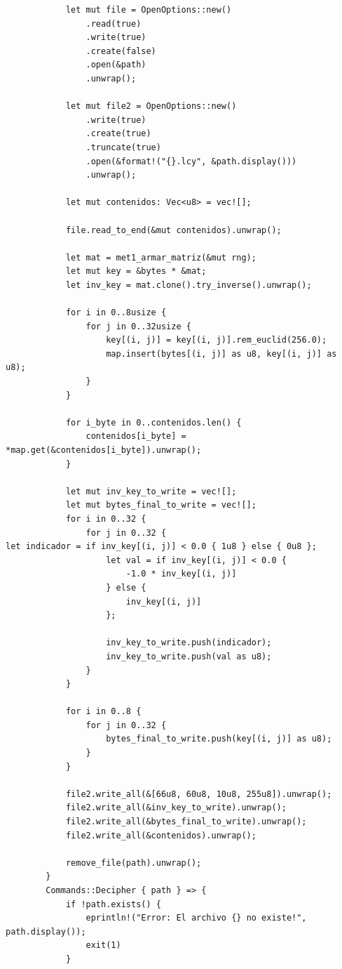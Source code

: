 \documentclass[a4paper]{article}
\begin{document}
\begin{verbatim}
            let mut file = OpenOptions::new()
                .read(true)
                .write(true)
                .create(false)
                .open(&path)
                .unwrap();

            let mut file2 = OpenOptions::new()
                .write(true)
                .create(true)
                .truncate(true)
                .open(&format!("{}.lcy", &path.display()))
                .unwrap();

            let mut contenidos: Vec<u8> = vec![];

            file.read_to_end(&mut contenidos).unwrap();

            let mat = met1_armar_matriz(&mut rng);
            let mut key = &bytes * &mat;
            let inv_key = mat.clone().try_inverse().unwrap();

            for i in 0..8usize {
                for j in 0..32usize {
                    key[(i, j)] = key[(i, j)].rem_euclid(256.0);
                    map.insert(bytes[(i, j)] as u8, key[(i, j)] as u8);
                }
            }

            for i_byte in 0..contenidos.len() {
                contenidos[i_byte] = *map.get(&contenidos[i_byte]).unwrap();
            }

            let mut inv_key_to_write = vec![];
            let mut bytes_final_to_write = vec![];
            for i in 0..32 {
                for j in 0..32 {
let indicador = if inv_key[(i, j)] < 0.0 { 1u8 } else { 0u8 };
                    let val = if inv_key[(i, j)] < 0.0 {
                        -1.0 * inv_key[(i, j)]
                    } else {
                        inv_key[(i, j)]
                    };

                    inv_key_to_write.push(indicador);
                    inv_key_to_write.push(val as u8);
                }
            }

            for i in 0..8 {
                for j in 0..32 {
                    bytes_final_to_write.push(key[(i, j)] as u8);
                }
            }

            file2.write_all(&[66u8, 60u8, 10u8, 255u8]).unwrap();
            file2.write_all(&inv_key_to_write).unwrap();
            file2.write_all(&bytes_final_to_write).unwrap();
            file2.write_all(&contenidos).unwrap();

            remove_file(path).unwrap();
        }
        Commands::Decipher { path } => {
            if !path.exists() {
                eprintln!("Error: El archivo {} no existe!", path.display());
                exit(1)
            }


\end{verbatim}
\end{document}
